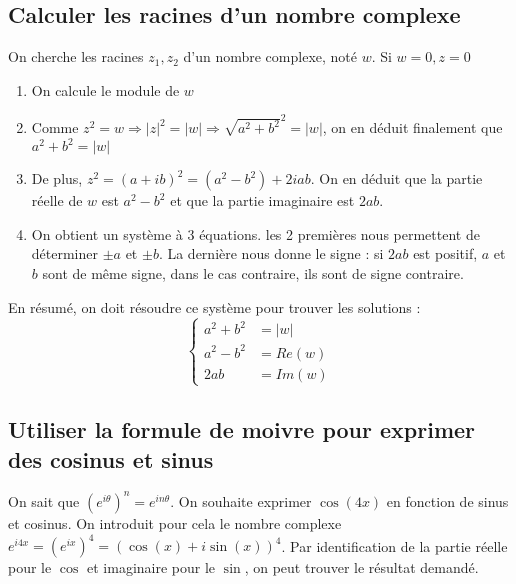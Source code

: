 \documentclass[french]{yLectureNote}
\begin{document}
\subsection{Calculer les racines d'un nombre complexe}
On cherche les racines $z_1,z_2$ d'un nombre complexe, noté $w$. Si $w=0, z=0$
\begin{enumerate}
 \item On calcule le module de $w$
 \item Comme $z^2=w \Rightarrow |z|^2 = |w| \Rightarrow \sqrt{a^2+b^2}^2 = |w|$, on en déduit finalement que $a^2+b^2 = |w|$
 \item De plus, $z^2 = (a+ib)^2 = (a^2-b^2)+2iab$. On en déduit que la partie réelle de $w$ est $a^2-b^2$ et que la partie imaginaire est $2ab$.
 \item On obtient un système à 3 équations. les 2 premières nous permettent de déterminer $\pm a$ et $\pm b$. La dernière nous donne le signe : si $2ab$ est positif, $a$ et $b$ sont de m\^eme signe, dans le cas contraire, ils sont de signe contraire.
\end{enumerate}
En résumé, on doit résoudre ce système pour trouver les solutions :\[ \left\{\begin{matrix}
a^2+b^2 &= |w|\\
a^2-b^2 &= Re(w)\\
2ab &= Im(w)
\end{matrix}\right.\]
%
%
\subsection{Utiliser la formule de moivre pour exprimer des cosinus et sinus}
On sait que $(e^{i\theta})^n = e^{in\theta}$. On souhaite exprimer $\cos(4x)$ en fonction de sinus et cosinus. On introduit pour cela le nombre complexe $e^{i4x} = (e^{ix})^4 = (\cos(x)+i\sin(x))^4$. Par identification de la partie réelle pour le $\cos$ et imaginaire pour le $\sin$, on peut trouver le résultat demandé.
\end{document}
